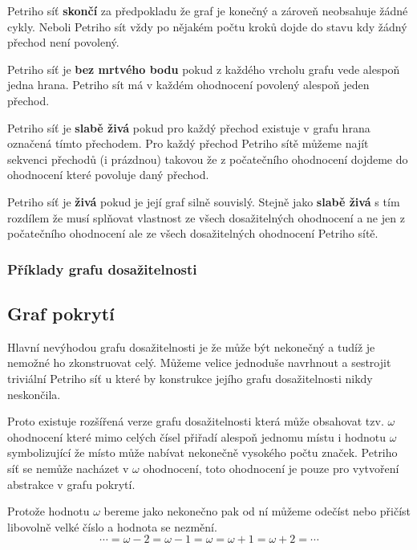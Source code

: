 \documentclass[
  biblatex,
  glossaries,
  index
]{kidiplom}
\begin{document}
Petriho síť \textbf{skončí} za předpokladu
že graf je konečný a zároveň neobsahuje žádné cykly.
Neboli Petriho sít vždy po nějakém počtu kroků dojde do stavu kdy žádný přechod není povolený.

Petriho síť je \textbf{bez mrtvého bodu}
pokud z každého vrcholu grafu vede alespoň jedna hrana.
Petriho sít má v každém ohodnocení povolený alespoň jeden přechod.

Petriho síť je \textbf{slabě živá} pokud pro
každý přechod existuje v grafu hrana označená tímto přechodem.
Pro každý přechod Petriho sítě můžeme najít sekvenci přechodů (i prázdnou) takovou
že z počatečního ohodnocení dojdeme do ohodnocení které povoluje daný přechod.

Petriho síť je \textbf{živá} pokud je její graf silně souvislý.
Stejně jako \textbf{slabě živá} s tím rozdílem že musí splňovat vlastnost ze všech dosažitelných ohodnocení
a ne jen z počatečního ohodnocení ale ze všech dosažitelných ohodnocení Petriho sítě.


\subsubsection{Příklady grafu dosažitelnosti}



\subsection{Graf pokrytí}

Hlavní nevýhodou grafu dosažitelnosti je že může být
nekonečný a tudíž je nemožné ho zkonstruovat celý.
Můžeme velice jednoduše navrhnout a sestrojit triviální Petriho síť u které by konstrukce jejího grafu dosažitelnosti nikdy neskončila.


Proto existuje rozšířená verze grafu dosažitelnosti která může obsahovat
tzv. $\omega$ ohodnocení které mimo celých čísel přiřadí alespoň jednomu místu 
i hodnotu $\omega$ symbolizující že místo může nabívat nekonečně 
vysokého počtu značek.
Petriho síť se nemůže nacházet v $\omega$ ohodnocení, toto ohodnocení je pouze
pro vytvoření abstrakce v grafu pokrytí.

Protože hodnotu $\omega$ bereme jako nekonečno pak od ní můžeme 
odečíst nebo přičíst libovolně velké číslo a hodnota se nezmění.
$$\dotsb = \omega - 2 = \omega - 1 = \omega = \omega + 1 = \omega + 2 = \dotsb$$
\end{document}
